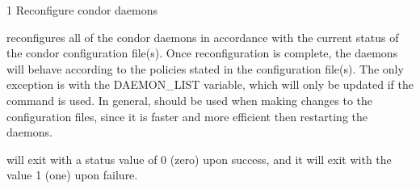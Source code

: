 \begin{ManPage}{\label{man-condor-reconfig}}{1}
{Reconfigure condor daemons}
\Synopsis {}
\ToolArgs


\Description 

 reconfigures all of the condor daemons in accordance with 
the current
status of the condor configuration file(s).  Once reconfiguration is complete,
the daemons will behave according to the policies stated in the configuration
file(s).  The only exception is with the DAEMON\_LIST variable, which will only be
updated if the  command is used.  In general,
 should be used when making changes to the configuration
files, since it is faster and more efficient then restarting the daemons.

\begin{Options}
	\ToolArgsDesc
\end{Options}

\ExitStatus

 will exit with a status value of 0 (zero) upon success,
and it will exit with the value 1 (one) upon failure.

\end{ManPage}

